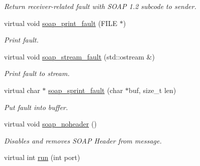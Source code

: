 \begin{DoxyCompactItemize}
\begin{DoxyCompactList}\small\item\em Return receiver-\/related fault with SOAP 1.2 subcode to sender. \item\end{DoxyCompactList}\item 
\hypertarget{classPASSPortBindingService_a491ed2ea964d97170fd4dae70af6486c}{
virtual void \hyperlink{classPASSPortBindingService_a491ed2ea964d97170fd4dae70af6486c}{soap\_\-print\_\-fault} (FILE $\ast$)}
\label{classPASSPortBindingService_a491ed2ea964d97170fd4dae70af6486c}

\begin{DoxyCompactList}\small\item\em Print fault. \item\end{DoxyCompactList}\item 
\hypertarget{classPASSPortBindingService_a089e89596f41c10ccce63bf115312ef1}{
virtual void \hyperlink{classPASSPortBindingService_a089e89596f41c10ccce63bf115312ef1}{soap\_\-stream\_\-fault} (std::ostream \&)}
\label{classPASSPortBindingService_a089e89596f41c10ccce63bf115312ef1}

\begin{DoxyCompactList}\small\item\em Print fault to stream. \item\end{DoxyCompactList}\item 
\hypertarget{classPASSPortBindingService_a1e8e8d745104eb2bf6ebf0372d2ff507}{
virtual char $\ast$ \hyperlink{classPASSPortBindingService_a1e8e8d745104eb2bf6ebf0372d2ff507}{soap\_\-sprint\_\-fault} (char $\ast$buf, size\_\-t len)}
\label{classPASSPortBindingService_a1e8e8d745104eb2bf6ebf0372d2ff507}

\begin{DoxyCompactList}\small\item\em Put fault into buffer. \item\end{DoxyCompactList}\item 
\hypertarget{classPASSPortBindingService_ab2863cdb62c414a2482c716d028e42e4}{
virtual void \hyperlink{classPASSPortBindingService_ab2863cdb62c414a2482c716d028e42e4}{soap\_\-noheader} ()}
\label{classPASSPortBindingService_ab2863cdb62c414a2482c716d028e42e4}

\begin{DoxyCompactList}\small\item\em Disables and removes SOAP Header from message. \item\end{DoxyCompactList}\item 
\hypertarget{classPASSPortBindingService_abe8e99ad9d40c212f1a420337a07d736}{
virtual int \hyperlink{classPASSPortBindingService_abe8e99ad9d40c212f1a420337a07d736}{run} (int port)}
\label{classPASSPortBindingService_abe8e99ad9d40c212f1a420337a07d736}


\end{DoxyCompactItemize}

